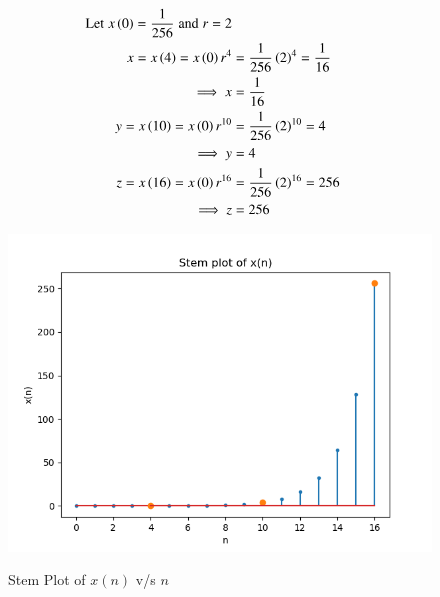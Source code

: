 \documentclass[journal,12pt,twocolumn]{IEEEtran}
\theoremstyle{remark}
\begin{document}
\begin{enumerate}
\begin{align}
    \notag\text{Let}\;x\left(0\right) =\dfrac{1}{256}\;\text{and}\;r = 2\\     \notag x=x\left(4\right)=x\left(0\right)r^4 &=\frac{1}{256}\left(2\right)^4=\frac{1}{16}\\
     \implies x&=\frac{1}{16} \\
    \notag y=x\left(10\right)=x\left(0\right)r^{10} &=\frac{1}{256}\left(2\right)^{10}=4\\
     \implies y&=4 \\
    \notag z=x\left(16\right)=x\left(0\right)r^{16} &=\frac{1}{256}\left(2\right)^{16}=256\\
    \implies z&=256 
\end{align}
\newpage
\begin{figure}[h]
    \renewcommand\thefigure{1}
    \centering
    \caption{Stem Plot of $x(n)$ v/s $n$}
    \includegraphics[width=\columnwidth]{A_1.png}
        \label{fig:1}
\end{figure}


\end{enumerate}
\end{document}
